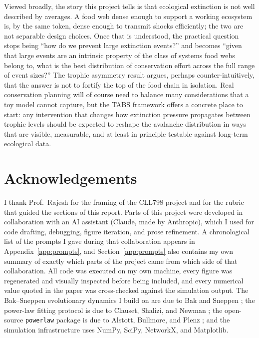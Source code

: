 \documentclass[10pt,a4paper,twocolumn]{article}
\begin{document}
Viewed broadly, the story this project tells is that ecological extinction is not well described by averages. A food web dense enough to support a working ecosystem is, by the same token, dense enough to transmit shocks efficiently; the two are not separable design choices. Once that is understood, the practical question stops being ``how do we prevent large extinction events?'' and becomes ``given that large events are an intrinsic property of the class of systems food webs belong to, what is the best distribution of conservation effort across the full range of event sizes?'' The trophic asymmetry result argues, perhaps counter-intuitively, that the answer is not to fortify the top of the food chain in isolation. Real conservation planning will of course need to balance many considerations that a toy model cannot capture, but the TABS framework offers a concrete place to start: any intervention that changes how extinction pressure propagates between trophic levels should be expected to reshape the avalanche distribution in ways that are visible, measurable, and at least in principle testable against long-term ecological data.

\section*{Acknowledgements}
I thank Prof.\ Rajesh for the framing of the CLL798 project and for the rubric that guided the sections of this report. Parts of this project were developed in collaboration with an AI assistant (Claude, made by Anthropic), which I used for code drafting, debugging, figure iteration, and prose refinement. A chronological list of the prompts I gave during that collaboration appears in Appendix~\ref{app:prompts}, and Section~\ref{app:prompts} also contains my own summary of exactly which parts of the project came from which side of that collaboration. All code was executed on my own machine, every figure was regenerated and visually inspected before being included, and every numerical value quoted in the paper was cross-checked against the simulation output. The Bak--Sneppen evolutionary dynamics I build on are due to Bak and Sneppen \citep{bak1993punctuated}; the power-law fitting protocol is due to Clauset, Shalizi, and Newman \citep{clauset2009power}; the open-source \texttt{powerlaw} package is due to Alstott, Bullmore, and Plenz \citep{alstott2014powerlaw}; and the simulation infrastructure uses NumPy, SciPy, NetworkX, and Matplotlib.
\end{document}
